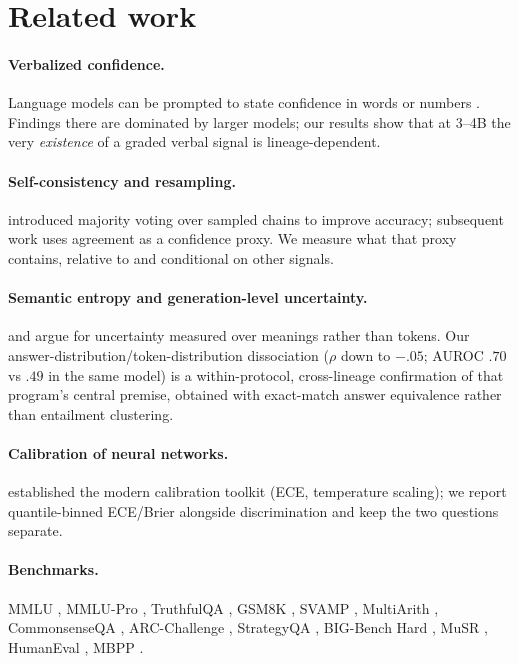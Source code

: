 \documentclass[10pt]{article}
\begin{document}
\section{Related work}
\paragraph{Verbalized confidence.} Language models can be prompted to state confidence in words
or numbers \citep{lin2022teaching,kadavath2022know,tian2023calibration}. Findings there are
dominated by larger models; our results show that at 3--4B the very \emph{existence} of a graded
verbal signal is lineage-dependent.

\paragraph{Self-consistency and resampling.} \citet{wang2023selfconsistency} introduced majority
voting over sampled chains to improve accuracy; subsequent work uses agreement as a confidence
proxy. We measure what that proxy contains, relative to and conditional on other signals.

\paragraph{Semantic entropy and generation-level uncertainty.} \citet{kuhn2023semantic} and
\citet{farquhar2024semantic} argue for uncertainty measured over meanings rather than tokens.
Our answer-distribution/token-distribution dissociation ($\rho$ down to $-.05$; AUROC $.70$ vs
$.49$ in the same model) is a within-protocol, cross-lineage confirmation of that program's
central premise, obtained with exact-match answer equivalence rather than entailment clustering.

\paragraph{Calibration of neural networks.} \citet{guo2017calibration} established the modern
calibration toolkit (ECE, temperature scaling); we report quantile-binned ECE/Brier alongside
discrimination and keep the two questions separate.

\paragraph{Benchmarks.} MMLU \citep{hendrycks2021mmlu}, MMLU-Pro \citep{wang2024mmlupro},
TruthfulQA \citep{lin2022truthfulqa}, GSM8K \citep{cobbe2021gsm8k}, SVAMP
\citep{patel2021svamp}, MultiArith \citep{roy2015arithmetic}, CommonsenseQA
\citep{talmor2019commonsenseqa}, ARC-Challenge \citep{clark2018arc}, StrategyQA
\citep{geva2021strategyqa}, BIG-Bench Hard \citep{suzgun2022bbh}, MuSR
\citep{sprague2024musr}, HumanEval \citep{chen2021evaluating}, MBPP \citep{austin2021program}.
\end{document}
